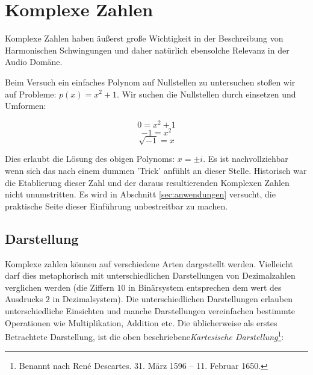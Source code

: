 \chapter{Komplexe Zahlen} \label{chap:complex}


Komplexe Zahlen haben äußerst große Wichtigkeit in der Beschreibung von Harmonischen Schwingungen und daher natürlich ebensolche Relevanz in der Audio Domäne. \\

Beim Versuch ein einfaches Polynom auf Nullstellen zu untersuchen stoßen wir auf Probleme: $p(x) = x^2 + 1$. Wir suchen die Nullstellen durch einsetzen und Umformen:

$$0 = x^2 + 1$$
$$-1 = x^2$$
$$\sqrt{-1} = x$$


Dies erlaubt die Lösung des obigen Polynoms: $x = \pm i$. Es ist nachvollziehbar wenn sich das nach einem dummen 'Trick' anfühlt an dieser Stelle. Historisch war die Etablierung dieser Zahl und der daraus resultierenden Komplexen Zahlen nicht unumstritten. Es wird in Abschnitt \ref{sec:anwendungen} versucht, die praktische Seite dieser Einführung unbestreitbar zu machen. \\

\section{Darstellung}
Komplexe zahlen können auf verschiedene Arten dargestellt werden. Vielleicht darf dies metaphorisch mit unterschiedlichen Darstellungen von Dezimalzahlen verglichen werden (die Ziffern $10$ in Binärsystem entsprechen dem wert des Ausdrucks $2$ in Dezimalsystem). Die unterschiedlichen Darstellungen erlauben unterschiedliche Einsichten und manche Darstellungen vereinfachen bestimmte Operationen wie Multiplikation, Addition etc. 
Die üblicherweise als erstes Betrachtete Darstellung, ist die oben beschriebene\emph{Kartesische Darstellung}\footnote{Benannt nach René Descartes. 31. März 1596 – 11. Februar 1650.}:

